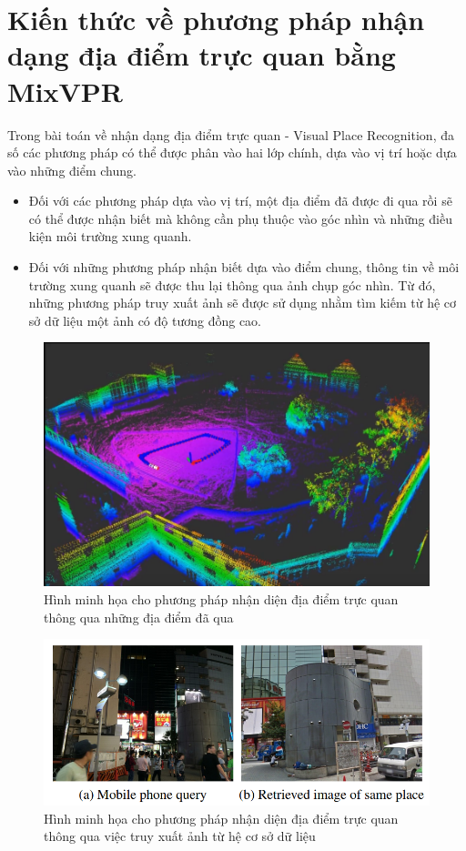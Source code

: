 \section{Kiến thức về phương pháp nhận dạng địa điểm trực quan bằng MixVPR}
Trong bài toán về nhận dạng địa điểm trực quan - Visual Place Recognition, đa số các phương pháp có thể được phân vào hai lớp chính, dựa vào vị trí hoặc dựa vào những điểm chung\cite{yin2022general}.
\begin{itemize}
    \item Đối với các phương pháp dựa vào vị trí, một địa điểm đã được đi qua rồi sẽ có thể được nhận biết mà không cần phụ thuộc vào góc nhìn và những điều kiện môi trường xung quanh.
    \item Đối với những phương pháp nhận biết dựa vào điểm chung, thông tin về môi trường xung quanh sẽ được thu lại thông qua ảnh chụp góc nhìn. Từ đó, những phương pháp truy xuất ảnh sẽ được sử dụng nhằm tìm kiếm từ hệ cơ sở dữ liệu một ảnh có độ tương đồng cao.
\end{itemize}
\begin{figure}[H]
    \centering
    \includegraphics[scale=0.4]{pics/Chapter3/position-based.png}
    \caption{Hình minh họa cho phương pháp nhận diện địa điểm trực quan thông qua những địa điểm đã qua \cite{slamposition}}
    \label{fig:enter-label}
\end{figure}
\begin{figure}[H]
    \centering
    \includegraphics[scale=0.7]{pics/Chapter3/overlap-based.png}
    \caption{Hình minh họa cho phương pháp nhận diện địa điểm trực quan thông qua việc truy xuất ảnh từ hệ cơ sở dữ liệu \cite{arandjelović2016netvlad}}
    \label{fig:enter-label}
\end{figure}

